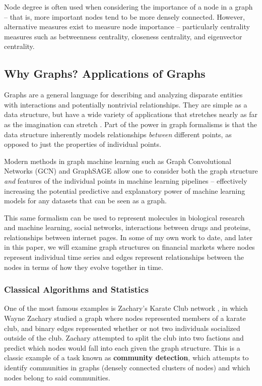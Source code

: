 \documentclass[12pt]{article}
\theoremstyle{definition}
\begin{document}
Node degree is often used when considering the importance of a node in a graph -- that is, more important nodes tend to be more densely connected. However, alternative measures exist to measure node importance -- particularly centrality measures such as betweenness centrality, closeness centrality, and eigenvector centrality. 

\subsection{Why Graphs? Applications of Graphs}
\label{subsec:motivation}

Graphs are a general language for describing and analyzing disparate entities with interactions and potentially nontrivial relationships. They are simple as a data structure, but have a wide variety of applications that stretches nearly as far as the imagination can stretch \cite{hamiltonGRL}. Part of the power in graph formalisms is that the data structure inherently models relationships \textit{between} different points, as opposed to just the properties of individual points. 

Modern methods in graph machine learning such as Graph Convolutional Networks (GCN) \cite{GCNPaper} and GraphSAGE \cite{graphSAGE} allow one to consider both the graph structure \textit{and} features of the individual points in machine learning pipelines -- effectively increasing the potential predictive and explanatory power of machine learning models for any datasets that can be seen as a graph. 

This same formalism can be used to represent molecules in biological research and machine learning, social networks, interactions between drugs and proteins, relationships between internet pages. In some of my own work to date, and later in this paper, we will examine graph structures on financial markets where nodes represent individual time series and edges represent relationships between the nodes in terms of how they evolve together in time. 

\subsubsection{Classical Algorithms and Statistics}

One of the most famous examples is Zachary's Karate Club network \cite{zacharyKarateClub}, in which Wayne Zachary studied a graph where nodes represented members of a karate club, and binary edges represented whether or not two individuals socialized outside of the club. Zachary attempted to split the club into two factions and predict which nodes would fall into each given the graph structure. This is a classic example of a task known as \textbf{community detection}, which attempts to identify communities in graphs (densely connected clusters of nodes) and which nodes belong to said communities.
\end{document}
